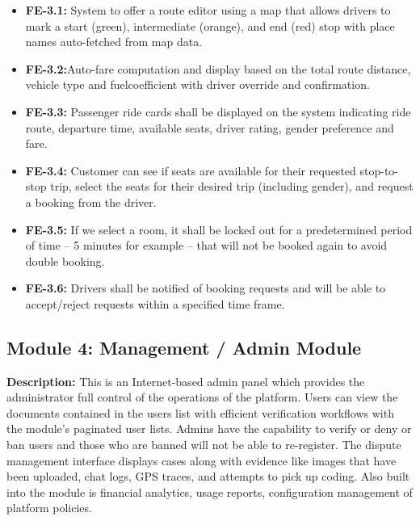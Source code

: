 \begin{itemize}
    \item \textbf{FE-3.1:} System to offer a route editor using a map that allows drivers to mark a start (green), intermediate (orange), and end (red) stop with place names auto-fetched from map data.

    \item \textbf{FE-3.2:}Auto-fare computation and display based on the total route distance, vehicle type and fuelcoefficient with driver override and confirmation.

    \item \textbf{FE-3.3:} Passenger ride cards shall be displayed on the system indicating ride route, departure time, available seats, driver rating, gender preference and fare.

    \item \textbf{FE-3.4:} Customer can see if seats are available for their requested stop-to-stop trip, select the seats for their desired trip (including gender), and request a booking from the driver.

    \item \textbf{FE-3.5:} If we select a room, it shall be locked out for a predetermined period of time – 5 minutes for example – that will not be booked again to avoid double booking.

    \item \textbf{FE-3.6:} Drivers shall be notified of booking requests and will be able to accept/reject requests within a specified time frame.
\end{itemize}

\subsection{Module 4: Management / Admin Module}

\textbf{Description:} This is an Internet-based admin panel which provides the administrator full control of the operations of the platform. Users can view the documents contained in the users list with efficient verification workflows with the module's paginated user lists. Admins have the capability to verify or deny or ban users and those who are banned will not be able to re-register. The dispute management interface displays cases along with evidence like images that have been uploaded, chat logs, GPS traces, and attempts to pick up coding. Also built into the module is financial analytics, usage reports, configuration management of platform policies.

